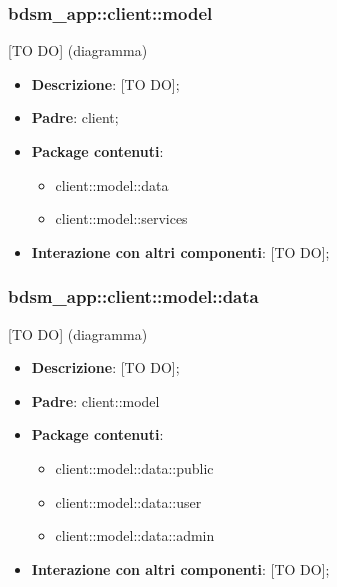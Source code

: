 %
%



\subsubsection{bdsm\_app::client::model} %
\label{ssub:bdsm_app_client_model}
[TO DO] (diagramma) \newline \newline

\begin{itemize}
	\item \textbf{Descrizione}: [TO DO];
	\item \textbf{Padre}: client;
	\item \textbf{Package contenuti}:
		\begin{itemize}
			\item client::model::data
			\item client::model::services
		\end{itemize}
	\item \textbf{Interazione con altri componenti}: [TO DO];
\end{itemize}


\subsubsection{bdsm\_app::client::model::data} %
\label{ssub:bdsm_app_client_model_data}
[TO DO] (diagramma) \newline \newline

\begin{itemize}
	\item \textbf{Descrizione}: [TO DO];
	\item \textbf{Padre}: client::model
	\item \textbf{Package contenuti}:
		\begin{itemize}
			\item client::model::data::public
			\item client::model::data::user
			\item client::model::data::admin
		\end{itemize}
	\item \textbf{Interazione con altri componenti}: [TO DO];
\end{itemize}

